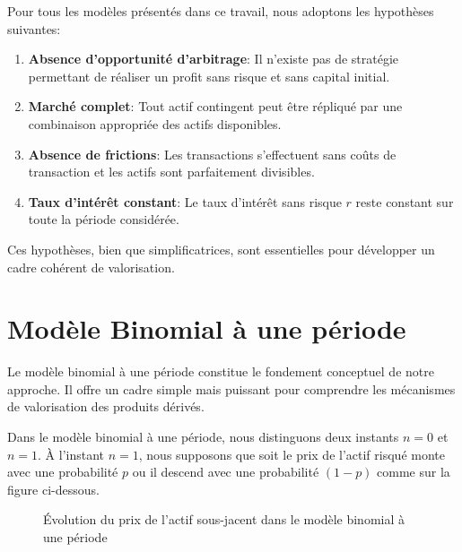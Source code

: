 \documentclass[12pt,a4paper]{report}
\begin{document}
Pour tous les modèles présentés dans ce travail, nous adoptons les hypothèses suivantes:

\begin{enumerate}
    \item \textbf{Absence d'opportunité d'arbitrage}: Il n'existe pas de stratégie permettant de réaliser un profit sans risque et sans capital initial.
    
    \item \textbf{Marché complet}: Tout actif contingent peut être répliqué par une combinaison appropriée des actifs disponibles.
    
    \item \textbf{Absence de frictions}: Les transactions s'effectuent sans coûts de transaction et les actifs sont parfaitement divisibles.
    
    \item \textbf{Taux d'intérêt constant}: Le taux d'intérêt sans risque $r$ reste constant sur toute la période considérée.
\end{enumerate}

Ces hypothèses, bien que simplificatrices, sont essentielles pour développer un cadre cohérent de valorisation.



\section{Modèle Binomial à une période}



Le modèle binomial à une période constitue le fondement conceptuel de notre approche. Il offre un cadre simple mais puissant pour comprendre les mécanismes de valorisation des produits dérivés.


Dans le modèle binomial à une période, nous distinguons deux instants $n=0$ et $n=1$. À l'instant $n=1$, nous supposons que soit le prix de l'actif risqué monte avec une probabilité $p$ ou il descend avec une probabilité $(1-p)$ comme sur la figure ci-dessous.

\begin{figure}[h]
\centering
{}
\caption{Évolution du prix de l'actif sous-jacent dans le modèle binomial à une période}
\label{fig:one_period}
\end{figure}
\end{document}
